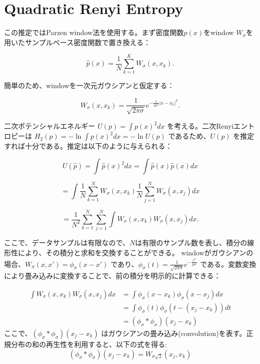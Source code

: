 \documentclass[dvipdfmx,a4paper]{jsarticle}%
\begin{document}
\section{\textbf{Quadratic Renyi Entropy}}
\begin{dfn}\label{def:renyi-entropy}
  この推定ではParzen window法を使用する。まず密度関数$p(x)$をwindow $W_\sigma$を用いたサンプルベース密度関数で置き換える：

$$\hat{p}(x) = \frac{1}{N} \sum_{k=1}^{K} W_\sigma(x, x_k).$$

\noindent
簡単のため、windowを一次元ガウシアンと仮定する：

$$W_\sigma(x, x_k) = \frac{1}{\sqrt{2\pi\sigma}} e^{-\frac{1}{2\sigma^2}|x-x_k|^2}.$$

二次ポテンシャルエネルギー $U(p) = \int p(x)^2 dx$ を考える。二次Renyiエントロピーは $H_2(p) = -\ln \int \hat{p}(x)^2 dx = -\ln U(p)$ であるため、$U(p)$ を推定すれば十分である。推定は以下のように与えられる：

$$U(\hat{p}) = \int \hat{p}(x)^2 dx = \int \hat{p}(x)\hat{p}(x) dx$$

$$= \int \frac{1}{N} \sum_{k=1}^N W_\sigma(x, x_k) \frac{1}{N} \sum_{j=1}^N W_\sigma(x, x_j) dx$$

$$= \frac{1}{N^2} \sum_{k=1}^N \sum_{j=1}^N \int W_\sigma(x, x_k)W_\sigma(x, x_j) dx.$$

ここで、データサンプルは有限なので、$N$は有限のサンプル数を表し、積分の線形性により、その積分と求和を交換することができる。
\newpage
windowがガウシアンの場合、$W_\sigma(x, x') = \phi_\sigma(x - x')$ であり、$\phi_\sigma(t) = \frac{1}{\sqrt{2\pi\sigma}} e^{-\frac{t^2}{2\sigma^2}}$ である。変数変換により畳み込みに変換することで、前の積分を明示的に計算できる：

\begin{align*}
\int W_\sigma(x,x_k)W_\sigma(x,x_j) dx &= \int \phi_\sigma(x - x_k)\phi_\sigma(x - x_j) dx \\
&= \int \phi_\sigma(t)\phi_\sigma(t - (x_j - x_k)) dt\\
&=  (\phi_\sigma * \phi_\sigma)(x_j - x_k)
\end{align*}
ここで、$(\phi_\sigma * \phi_\sigma)(x_j - x_k)$ はガウシアンの畳み込み(convolution)\footnotemark[1]を表す。正規分布の和の再生性\footnotemark[2]を利用すると、以下の式を得る:
$$(\phi_\sigma * \phi_\sigma)(x_j - x_k)=W_{\sigma\sqrt{2}}(x_j, x_k)$$


\end{dfn}
\end{document}
